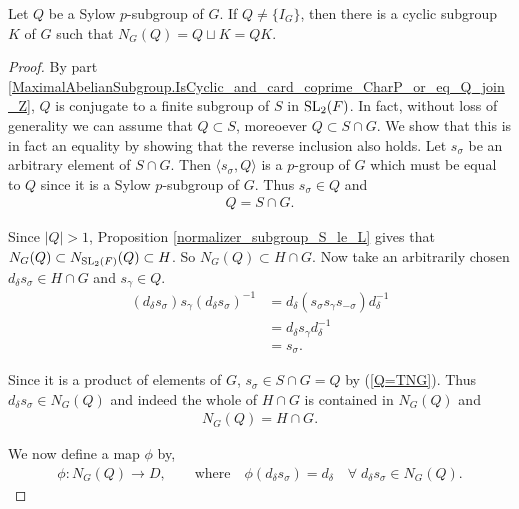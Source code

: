 \begin{footnotesize}
\begin{theorem}
  \label{MaximalAbelianSubgroup.exists_IsCyclic_K_normalizer_eq_Q_join_K}
  Let $Q$ be a Sylow $p$-subgroup of $G$. If $Q \neq \{I_G\}$, then there is a cyclic subgroup $K$ of $G$ such that $N_G(Q) = Q \sqcup K = QK$. \\
\end{theorem}
\begin{proof}
By part \ref{MaximalAbelianSubgroup.IsCyclic_and_card_coprime_CharP_or_eq_Q_join_Z}, $Q$ is conjugate to a finite subgroup of $S$ in $\operatorname{SL}_2(F)$. In fact, without loss of generality we can assume that $Q \subset S$, moreoever $Q \subset S \cap G$. We show that this is in fact an equality by showing that the reverse inclusion also holds. 
Let $s_\sigma$ be an arbitrary element of $S \cap G$. Then $\langle s_\sigma, Q \rangle$ is a $p$-group of $G$ which must be equal to $Q$ since it is a Sylow $p$-subgroup of $G$. Thus $s_\sigma \in Q$ and
\begin{align}\label{Q=TNG} Q = S \cap G.
\end{align}

Since $|Q| > 1$, Proposition \ref{normalizer_subgroup_S_le_L} gives that $N_G(Q) \subset N_{\operatorname{SL}_2(F)}(Q) \subset H$. So $N_G(Q) \subset H \cap G$. Now take an arbitrarily chosen $d_\delta s_\sigma \in H \cap G$ and $s_\gamma \in Q$.
\begin{align*} (d_\delta s_\sigma) s_\gamma (d_\delta s_\sigma)^{-1} &= d_\delta ( s_\sigma s_\gamma  s_{-\sigma}) d^{-1}_\delta
\\ &=  d_\delta s_\gamma d^{-1}_\delta %
\\ &= s_\sigma. %
\end{align*}

Since it is a product of elements of $G$, $s_\sigma \in S \cap G = Q$ by (\ref{Q=TNG}). Thus $d_\delta s_\sigma \in N_G(Q)$ and indeed the whole of $H \cap G$ is contained in $N_G(Q)$ and
\begin{align}\label{normQ=HNG} N_G(Q) = H \cap G.
\end{align}

We now define a map $\phi$ by,
\begin{align*} \phi : N_G(Q) \longrightarrow D, \qquad \text{where} \quad \! \phi(d_\delta s_\sigma) = d_\delta \quad \forall \; d_\delta s_\sigma \in N_G(Q).
\end{align*}


\end{proof}
\end{footnotesize}
